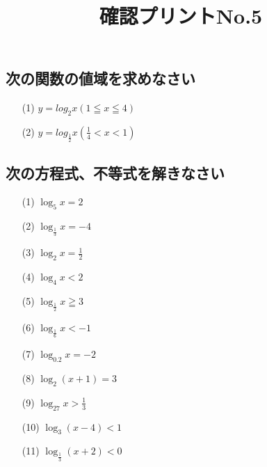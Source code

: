 \documentclass[12pt]{jarticle}
\title{確認プリントNo.5}
\begin{document}
\date{}
\maketitle
\vspace{-2cm}
\subsection*{次の関数の値域を求めなさい}
\begin{itemize}
  \item [(1)] $ \displaystyle y= log_2 x(1 \leqq x \leqq 4)$
  \item [(2)] $\displaystyle y = log_{\frac{1}{2}} x (\frac{1}{4} < x < 1)$
\end{itemize}

\subsection*{次の方程式、不等式を解きなさい}
\begin{itemize}
  \item [(1)] $ \displaystyle \log_5 x = 2$
  \item [(2)] $\displaystyle \log_{\frac{1}{3}} x = -4$
  \item [(3)] $\displaystyle \log_2 x = \frac{1}{2}$
  \item [(4)] $\displaystyle \log_4x < 2$
  \item [(5)] $\displaystyle \log_{\frac{1}{2}}x \geqq 3$
  \item [(6)] $\displaystyle \log_{\frac{1}{6}}x < -1$
  \item [(7)] $\displaystyle \log_{0.2} x = -2$
  \item [(8)] $\displaystyle \log_2 (x+1) = 3$
  \item [(9)] $\displaystyle \log_{27} x > \frac{1}{3}$
  \item [(10)] $\displaystyle \log_{3}(x-4) < 1$
  \item [(11)] $\displaystyle \log_{\frac{1}{3}}(x+2) < 0$
\end{itemize}
\end{document}
